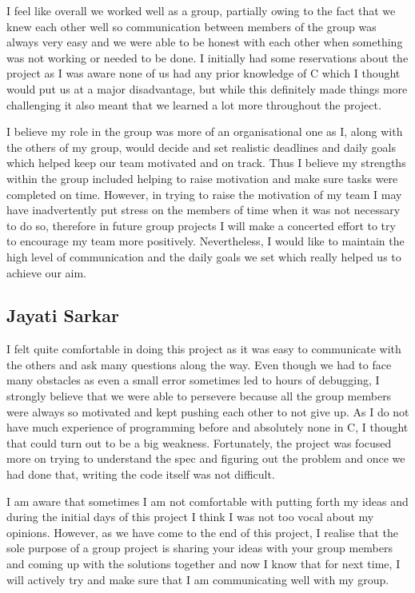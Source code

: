 \documentclass[11pt]{article}
\begin{document}
I feel like overall we worked well as a group, partially owing to the fact that we knew each other well so communication between members of the group was always very easy and we were able to be honest with each other when something was not working or needed to be done. I initially had some reservations about the project as I was aware none of us had any prior knowledge of C which I thought would put us at a major disadvantage, but while this definitely made things more challenging it also meant that we learned a lot more throughout the project.

I believe my role in the group was more of an organisational one as I, along with the others of my group, would decide and set realistic deadlines and daily goals which helped keep our team motivated and on track. Thus I believe my strengths within the group included helping to raise motivation and make sure tasks were completed on time. However, in trying to raise the motivation of my team I may have inadvertently put stress on the members of time when it was not necessary to do so, therefore in future group projects I will make a concerted effort to try to encourage my team more positively. Nevertheless, I would like to maintain the high level of communication and the daily goals we set which really helped us to achieve our aim.

\subsection{Jayati Sarkar}

I felt quite comfortable in doing this project as it was easy to communicate with the others and ask many questions along the way. Even though we had to face many obstacles as even a small error sometimes led to hours of debugging, I strongly believe that we were able to persevere because all the group members were always so motivated and kept pushing each other to not give up.
As I do not have much experience of programming before and absolutely none in C, I thought that could turn out to be a big weakness. Fortunately, the project was focused more on trying to understand the spec and figuring out the problem and once we had done that, writing the code itself was not difficult.

I am aware that sometimes I am not comfortable with putting forth my ideas and during the initial days of this project I think I was not too vocal about my opinions. However, as we have come to the end of this project, I realise that the sole purpose of a group project is sharing your ideas with your group members and coming up with the solutions together and now I know that for next time, I will actively try and make sure that I am communicating well with my group.
\end{document}
